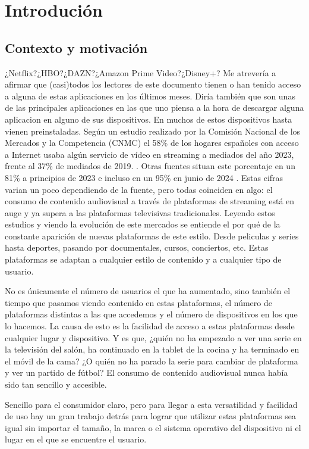 \chapter{Introdución}
\label{chap:introducion}

\section{Contexto y motivación}
\label{sec:contexto}
¿Netflix?¿HBO?¿DAZN?¿Amazon Prime Video?¿Disney+? Me atrevería a afirmar que
(casi)todos los lectores de este documento tienen o han tenido acceso a alguna de 
estas aplicaciones en los últimos meses. Diría también que son unas de las principales
aplicaciones en las que uno piensa a la hora de descargar alguna aplicacion en alguno de sus dispositivos.
En muchos de estos dispositivos hasta vienen preinstaladas. Según un estudio
realizado por la Comisión Nacional de los Mercados y la Competencia (CNMC) el 58\% de los hogares 
españoles con acceso a Internet usaba algún servicio de vídeo en streaming a mediados del año 2023, 
frente al 37\% de mediados de 2019. \cite{CNMC}. Otras fuentes situan este porcentaje en un 81\% a principios
de 2023 \cite{Streaming2023} e incluso en un 95\% en junio de 2024 \cite{Streaming2024}. Estas cifras varian un poco dependiendo
de la fuente, pero todas coinciden en algo: el consumo de contenido audiovisual a través de plataformas de streaming
está en auge y ya supera a las plataformas televisivas tradicionales. Leyendo estos estudios y viendo la evolución de
este mercados se entiende el por qué de la constante aparición de nuevas plataformas de este estilo. Desde peliculas y series
hasta deportes, pasando por documentales, cursos, conciertos, etc. Estas plataformas se adaptan a cualquier estilo
de contenido y a cualquier tipo de usuario. 

No es únicamente el número de usuarios el que ha aumentado, sino también el tiempo que pasamos viendo contenido 
en estas plataformas, el número de plataformas distintas a las que accedemos y el número de dispositivos en los
que lo hacemos. La causa de esto es la facilidad de acceso a estas plataformas desde cualquier lugar y dispositivo. 
Y es que, ¿quién no ha empezado a ver una serie en la televisión del salón, ha continuado en la tablet de la cocina y 
ha terminado en el móvil de la cama? ¿O quién no ha parado la serie para cambiar de plataforma y ver un partido 
de fútbol? El consumo de contenido audiovisual nunca había sido tan sencillo y accesible. 

Sencillo para el consumidor claro, pero para llegar a esta versatilidad y facilidad de uso hay un gran trabajo detrás 
para lograr que utilizar estas plataformas sea igual sin importar el tamaño, la marca o el sistema operativo del dispositivo
ni el lugar en el que se encuentre el usuario. 


